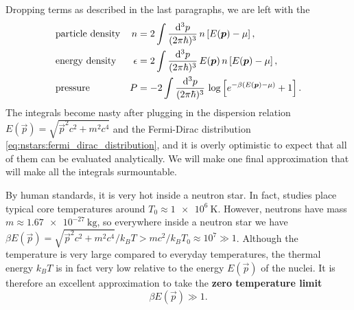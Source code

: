 Dropping terms as described in the last paragraphs, we are left with the
\begin{subequations}
\begin{align}
	& \text{particle density} & n        &=  2 \int \frac{\mathop{}\!\mathrm{d}^3 p}{(2 \pi \hbar)^3} \, n \left[ E({\bm{p}})-\mu \right] ,                    \label{eq:nstars:dropped_infinities_density} \\
	& \text{energy density}   & \epsilon &=  2 \int \frac{\mathop{}\!\mathrm{d}^3 p}{(2 \pi \hbar)^3} \, E({\bm{p}}) \, n \left[ E({\bm{p}})-\mu \right] ,      \label{eq:nstars:dropped_infinities_energy_density} \\
	& \text{pressure}         & P        &= -2 \int \frac{\mathop{}\!\mathrm{d}^3 p}{(2 \pi \hbar)^3} \, \log \left[ e^{-\beta(E({\bm{p}})-\mu)} + 1 \right] . \label{eq:nstars:dropped_infinities_pressure}
\end{align}
\label{eq:nstars:dropped_infinities}
\end{subequations}
The integrals become nasty after plugging in the dispersion relation $E(\vec{p}) = \sqrt{\vec{p}^2 c^2 + m^2 c^4}$  and the Fermi-Dirac distribution \eqref{eq:nstars:fermi_dirac_distribution}, and it is overly optimistic to expect that all of them can be evaluated analytically.
We will make one final approximation that will make all the integrals surmountable.

By human standards, it is very hot inside a neutron star.
In fact, studies place typical core temperatures around $T_0 \approx \SI{1e6}{\kelvin}$.
However, neutrons have mass $m \approx \SI{1.67e-27}{\kilogram}$, so everywhere inside a neutron star we have $\beta E(\vec{p}) = \sqrt{\vec{p}^2 c^2 + m^2 c^4} / k_B T > m c^2 / k_B T_0 \approx 10^7 \gg 1$.
Although the temperature is very large compared to everyday temperatures, the thermal energy $k_B T$ is in fact very low relative to the energy $E(\vec{p})$ of the nuclei.
It is therefore an excellent approximation to take the \textbf{zero temperature limit}
\begin{equation}
	\beta E(\vec{p}) \gg 1 .
\end{equation}

